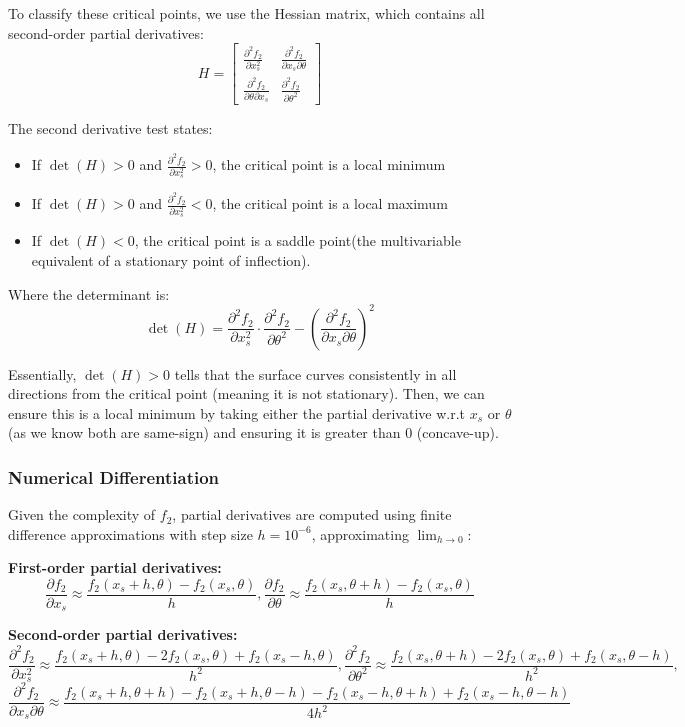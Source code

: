 \documentclass[10pt]{article}
\begin{document}
To classify these critical points, we use the Hessian matrix, which contains all second-order partial derivatives:
\[
H = \begin{bmatrix}
\frac{\partial^2 f_2}{\partial x_s^2} & \frac{\partial^2 f_2}{\partial x_s \partial \theta} \\
\frac{\partial^2 f_2}{\partial \theta \partial x_s} & \frac{\partial^2 f_2}{\partial \theta^2}
\end{bmatrix}
\]

The second derivative test states:
\begin{itemize}
    \item If $\det(H) > 0$ and $\frac{\partial^2 f_2}{\partial x_s^2} > 0$, the critical point is a local minimum
    \item If $\det(H) > 0$ and $\frac{\partial^2 f_2}{\partial x_s^2} < 0$, the critical point is a local maximum
    \item If $\det(H) < 0$, the critical point is a saddle point(the multivariable equivalent of a stationary point of inflection).
\end{itemize}

Where the determinant is:
\[
\det(H) = \frac{\partial^2 f_2}{\partial x_s^2} \cdot \frac{\partial^2 f_2}{\partial \theta^2} - \left(\frac{\partial^2 f_2}{\partial x_s \partial \theta}\right)^2
\]

Essentially, $\det(H) > 0$ tells that the surface curves consistently in all directions from the critical point (meaning it is not stationary). Then, we can ensure this is a local minimum by taking either the partial derivative w.r.t $x_s$ or $\theta$ (as we know both are same-sign) and ensuring it is greater than 0 (concave-up). 

\subsubsection{Numerical Differentiation}
Given the complexity of $f_2$, partial derivatives are computed using finite difference approximations with step size $h = 10^{-6}$, approximating $\lim_{h\rightarrow0}$:

\textbf{First-order partial derivatives:}
\[
\frac{\partial f_2}{\partial x_s} \approx \frac{f_2(x_s + h, \theta) - f_2(x_s, \theta)}{h}, \frac{\partial f_2}{\partial \theta} \approx \frac{f_2(x_s, \theta + h) - f_2(x_s, \theta)}{h}
\]

\textbf{Second-order partial derivatives:}
\[
\frac{\partial^2 f_2}{\partial x_s^2} \approx \frac{f_2(x_s + h, \theta) - 2f_2(x_s, \theta) + f_2(x_s - h, \theta)}{h^2}, \frac{\partial^2 f_2}{\partial \theta^2} \approx \frac{f_2(x_s, \theta + h) - 2f_2(x_s, \theta) + f_2(x_s, \theta - h)}{h^2},
\]
\[
\frac{\partial^2 f_2}{\partial x_s \partial \theta} \approx \frac{f_2(x_s+h, \theta+h) - f_2(x_s+h, \theta-h) - f_2(x_s-h, \theta+h) + f_2(x_s-h, \theta-h)}{4h^2}
\]
\end{document}
